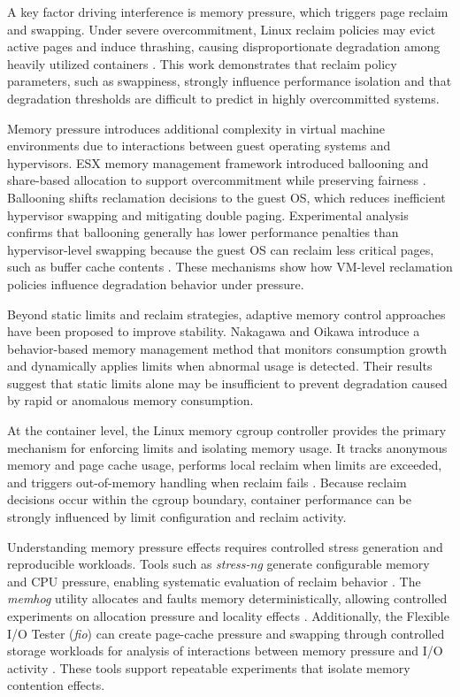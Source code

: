 \documentclass[conference]{IEEEtran}
\begin{document}
A key factor driving interference is memory pressure, which triggers page reclaim and swapping. Under severe overcommitment, Linux reclaim policies may evict active pages and induce thrashing, causing disproportionate degradation among heavily utilized containers \cite{nakazawa2017taming}. This work demonstrates that reclaim policy parameters, such as swappiness, strongly influence performance isolation and that degradation thresholds are difficult to predict in highly overcommitted systems.

Memory pressure introduces additional complexity in virtual machine environments due to interactions between guest operating systems and hypervisors. ESX memory management framework introduced ballooning and share-based allocation to support overcommitment while preserving fairness \cite{WaldspurgerProceedingsOT}. Ballooning shifts reclamation decisions to the guest OS, which reduces inefficient hypervisor swapping and mitigating double paging. Experimental analysis confirms that ballooning generally has lower performance penalties than hypervisor-level swapping because the guest OS can reclaim less critical pages, such as buffer cache contents \cite{moniruzzaman2014ballooning}. These mechanisms show how VM-level reclamation policies influence degradation behavior under pressure.

Beyond static limits and reclaim strategies, adaptive memory control approaches have been proposed to improve stability. Nakagawa and Oikawa \cite{nakagawa2016behavior} introduce a behavior-based memory management method that monitors consumption growth and dynamically applies limits when abnormal usage is detected. Their results suggest that static limits alone may be insufficient to prevent degradation caused by rapid or anomalous memory consumption.

At the container level, the Linux memory cgroup controller provides the primary mechanism for enforcing limits and isolating memory usage. It tracks anonymous memory and page cache usage, performs local reclaim when limits are exceeded, and triggers out-of-memory handling when reclaim fails \cite{linux_cgroup_memory_controller}. Because reclaim decisions occur within the cgroup boundary, container performance can be strongly influenced by limit configuration and reclaim activity.

Understanding memory pressure effects requires controlled stress generation and reproducible workloads. Tools such as \textit{stress-ng} generate configurable memory and CPU pressure, enabling systematic evaluation of reclaim behavior \cite{stressng}. The \textit{memhog} utility allocates and faults memory deterministically, allowing controlled experiments on allocation pressure and locality effects \cite{memhog_manpage}. Additionally, the Flexible I/O Tester (\textit{fio}) can create page-cache pressure and swapping through controlled storage workloads for analysis of interactions between memory pressure and I/O activity \cite{fio2023}. These tools support repeatable experiments that isolate memory contention effects.
\end{document}
